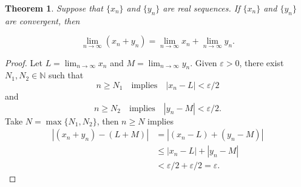 \documentclass[11pt, a4paper]{article}
\theoremstyle{plain}
\newtheorem{theorem}{Theorem}
\begin{document}
\begin{theorem}
Suppose that $\{x_n\}$ and $\{y_n\}$ are real sequences. If $\{x_n\}$ and $\{y_n\}$ are convergent, then

\[
\lim_{n \to \infty} (x_n + y_n)
=
\lim_{n \to \infty} x_n
+
\lim_{n \to \infty} y_n.
\]

\end{theorem}

\begin{proof}
Let $L=\lim_{n \to \infty} x_n$ and $M=\lim_{n \to \infty} y_n$. Given $\varepsilon >0$, there exist $N_1,N_2 \in \mathbb{N}$ such that
\[
 n \geq N_1 \quad \text{implies} \quad |x_n-L| < \varepsilon/2
 \]and 
 \[
 n \geq N_2 \quad \text{implies} \quad |y_n-M| < \varepsilon/2.
 \]
 Take $N=\max{\{N_1, N_2\}}$, then $ n \geq N$ implies
 \begin{align*}
 |(x_n+y_n)-(L+M)|&=|(x_n-L)+(y_n-M)|\\ 
 &\leq |x_n-L|+|y_n-M|\\
 &<\varepsilon/2+\varepsilon/2=\varepsilon.
 \end{align*}
\end{proof} 
\end{document}
